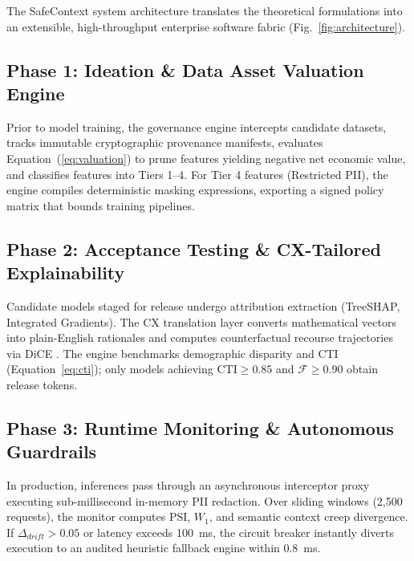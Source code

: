 \documentclass[journal]{IEEEtran}
\begin{document}
The SafeContext system architecture translates the theoretical formulations into an extensible, high-throughput enterprise software fabric (Fig.~\ref{fig:architecture}).

\subsection{Phase 1: Ideation \& Data Asset Valuation Engine}
Prior to model training, the governance engine intercepts candidate datasets, tracks immutable cryptographic provenance manifests, evaluates Equation~(\ref{eq:valuation}) to prune features yielding negative net economic value, and classifies features into Tiers 1--4. For Tier 4 features (Restricted PII), the engine compiles deterministic masking expressions, exporting a signed policy matrix that bounds training pipelines.

\subsection{Phase 2: Acceptance Testing \& CX-Tailored Explainability}
Candidate models staged for release undergo attribution extraction (TreeSHAP, Integrated Gradients). The CX translation layer converts mathematical vectors into plain-English rationales and computes counterfactual recourse trajectories via DiCE \cite{mothilal2020explaining}. The engine benchmarks demographic disparity and CTI (Equation~\ref{eq:cti}); only models achieving $\text{CTI} \ge 0.85$ and $\mathcal{F} \ge 0.90$ obtain release tokens.

\subsection{Phase 3: Runtime Monitoring \& Autonomous Guardrails}
In production, inferences pass through an asynchronous interceptor proxy executing sub-millisecond in-memory PII redaction. Over sliding windows (2,500 requests), the monitor computes PSI, $W_1$, and semantic context creep divergence. If $\Delta_{drift} > 0.05$ or latency exceeds 100~ms, the circuit breaker instantly diverts execution to an audited heuristic fallback engine within 0.8~ms.
\end{document}
